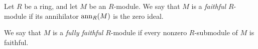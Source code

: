\documentclass[12pt]{article}
\begin{document}
Let $R$ be a ring, and let $M$ be an $R$-module.  
We say that $M$ is a {\it faithful} $R$-module 
if its annihilator ${\rm ann}_R(M)$ is the zero ideal.

We say that $M$ is a {\it fully faithful} $R$-module
if every nonzero $R$-submodule of $M$ is faithful.
\end{document}
